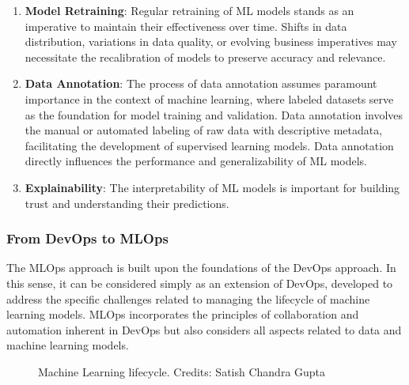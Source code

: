 \begin{enumerate}
    \item \textbf{Model Retraining}: Regular retraining of ML models stands as an imperative to maintain their effectiveness over time. Shifts in data distribution, variations in data quality, or evolving business imperatives may necessitate the recalibration of models to preserve accuracy and relevance. 

    \item \textbf{Data Annotation}: The process of data annotation assumes paramount importance in the context of machine learning, where labeled datasets serve as the foundation for model training and validation. Data annotation involves the manual or automated labeling of raw data with descriptive metadata, facilitating the development of supervised learning models. Data annotation directly influences the performance and generalizability of ML models.

    \item \textbf{Explainability}: The interpretability of ML models is important for building trust and understanding their predictions.
\end{enumerate}


\subsubsection{From DevOps to MLOps}

The MLOps approach is built upon the foundations of the DevOps approach. In this sense, it can be considered simply as an extension of DevOps, developed to address the specific challenges related to managing the lifecycle of machine learning models. MLOps incorporates the principles of collaboration and automation inherent in DevOps but also considers all aspects related to data and machine learning models.

\begin{figure}[htbp]
    \centering
    \caption{Machine Learning lifecycle. Credits: Satish Chandra Gupta}
    \label{fig:mlops-cycle}
\end{figure}


